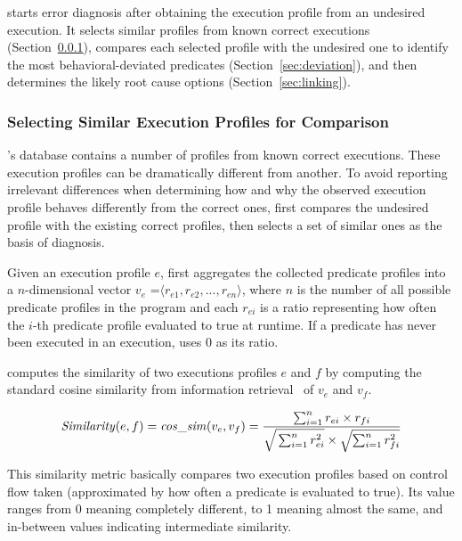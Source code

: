 \ourtool starts error diagnosis after obtaining the execution profile from
an undesired execution. It selects similar
profiles from known correct executions (Section~\ref{sec:similar}), compares
each selected profile with
the undesired one to identify the most behavioral-deviated predicates
(Section~\ref{sec:deviation}), and then determines
the likely root cause options (Section~\ref{sec:linking}).


\subsubsection{Selecting Similar Execution Profiles for Comparison}
\label{sec:similar}

\ourtool's database contains a number of
profiles from known correct executions.  These execution profiles 
can be dramatically different from another.  To avoid reporting irrelevant
differences when 
determining how and why the observed execution profile behaves
differently from the correct ones, \ourtool first
compares the undesired profile with the existing
correct profiles, then selects a set of similar ones
as the basis of diagnosis.

Given an execution profile $e$, \ourtool first aggregates
the collected predicate profiles into a $n$-dimensional
vector $v_e$ =$\langle r_{e1}, r_{e2}, ..., r_{en}\rangle$, where $n$
is the number of all possible predicate profiles in the program
and each $r_{ei}$ is a ratio representing how often the $i$-th predicate
profile evaluated to true at runtime.
If a predicate has never been executed in an execution,
\ourtool uses 0 as its ratio. 

\ourtool computes the similarity of two executions profiles $e$ and $f$
by computing the standard cosine similarity from information retrieval~\cite{Witten96managinggigabytes}
of $v_{e}$ and $v_{f}$.

\vspace{-2mm}

{\small{
\[
\|Similarity|(e, f) = \|cos\_sim|(v_{e}, v_{f}) = \frac{\sum_{i = 1}^{n}r_{ei} \times r_{fi}}
{\sqrt{\strut \sum_{i = 1}^{n}r_{ei}^2} \times \sqrt{\sum_{i = 1}^{n}r_{fi}^2}}
\]
}}

\vspace{-2mm}

This similarity metric basically compares two execution profiles based on
 control flow taken (approximated by how often a predicate is evaluated to
true). Its value ranges from 0 meaning completely different, to 1 meaning almost the same, 
and in-between values indicating intermediate similarity.


